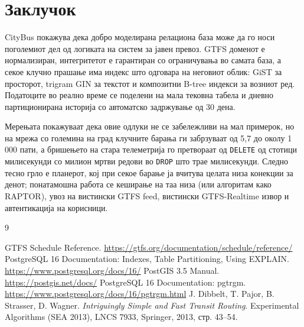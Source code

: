 \documentclass[11pt, a4paper]{article}
\renewcommand{\_}{\oldunderscore\allowbreak}
\newcommand{\code}[1]{\texttt{#1}}
\begin{document}
\section{Заклучок}

CityBus покажува дека добро моделирана релациона база може да го носи поголемиот дел од логиката на систем за јавен превоз. GTFS доменот е нормализиран, интегритетот е гарантиран со ограничувања во самата база, а секое клучно прашање има индекс што одговара на неговиот облик: GiST за просторот, trigram GIN за текстот и композитни B-tree индекси за возниот ред. Податоците во реално време се поделени на мала тековна табела и дневно партиционирана историја со автоматско задржување од 30 дена.

Мерењата покажуваат дека овие одлуки не се забележливи на мал примерок, но на мрежа со големина на град клучните барања ги забрзуваат од 5,7 до околу 1\,000 пати, а бришењето на стара телеметрија го претвораат од \code{DELETE} од стотици милисекунди со милион мртви редови во \code{DROP} што трае милисекунди. Следно тесно грло е планерот, кој при секое барање ја вчитува целата низа конекции за денот; понатамошна работа се кеширање на таа низа (или алгоритам како RAPTOR), увоз на вистински GTFS feed, вистински GTFS-Realtime извор и автентикација на корисници.

\begin{thebibliography}{9}
\small
{} GTFS Schedule Reference. \url{https://gtfs.org/documentation/schedule/reference/}
 PostgreSQL 16 Documentation: Indexes, Table Partitioning, Using EXPLAIN. \url{https://www.postgresql.org/docs/16/}
 PostGIS 3.5 Manual. \url{https://postgis.net/docs/}
 PostgreSQL 16 Documentation: pg\_trgm. \url{https://www.postgresql.org/docs/16/pgtrgm.html}
 J. Dibbelt, T. Pajor, B. Strasser, D. Wagner. \emph{Intriguingly Simple and Fast Transit Routing}. Experimental Algorithms (SEA 2013), LNCS 7933, Springer, 2013, стр. 43--54.
\end{thebibliography}
\end{document}
